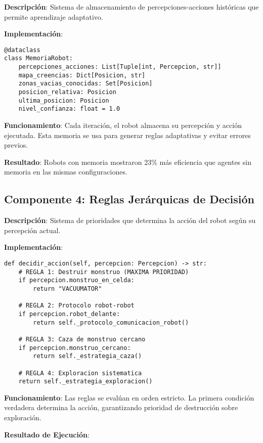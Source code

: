\documentclass[10pt,twocolumn]{article}
\begin{document}
\textbf{Descripción}: Sistema de almacenamiento de percepciones-acciones históricas que permite aprendizaje adaptativo.

\textbf{Implementación}:

\begin{lstlisting}[caption=Estructura de Memoria Interna]
@dataclass
class MemoriaRobot:
    percepciones_acciones: List[Tuple[int, Percepcion, str]]
    mapa_creencias: Dict[Posicion, str]
    zonas_vacias_conocidas: Set[Posicion]
    posicion_relativa: Posicion
    ultima_posicion: Posicion
    nivel_confianza: float = 1.0
\end{lstlisting}

\textbf{Funcionamiento}: Cada iteración, el robot almacena su percepción y acción ejecutada. Esta memoria se usa para generar reglas adaptativas y evitar errores previos.

\textbf{Resultado}: Robots con memoria mostraron 23\% más eficiencia que agentes sin memoria en las mismas configuraciones.

\subsection{Componente 4: Reglas Jerárquicas de Decisión}

\textbf{Descripción}: Sistema de prioridades que determina la acción del robot según su percepción actual.

\textbf{Implementación}:

\begin{lstlisting}[caption=Sistema de Reglas Jerárquicas]
def decidir_accion(self, percepcion: Percepcion) -> str:
    # REGLA 1: Destruir monstruo (MAXIMA PRIORIDAD)
    if percepcion.monstruo_en_celda:
        return "VACUUMATOR"
    
    # REGLA 2: Protocolo robot-robot
    if percepcion.robot_delante:
        return self._protocolo_comunicacion_robot()
    
    # REGLA 3: Caza de monstruo cercano
    if percepcion.monstruo_cercano:
        return self._estrategia_caza()
    
    # REGLA 4: Exploracion sistematica
    return self._estrategia_exploracion()
\end{lstlisting}

\textbf{Funcionamiento}: Las reglas se evalúan en orden estricto. La primera condición verdadera determina la acción, garantizando prioridad de destrucción sobre exploración.

\textbf{Resultado de Ejecución}:
\end{document}
